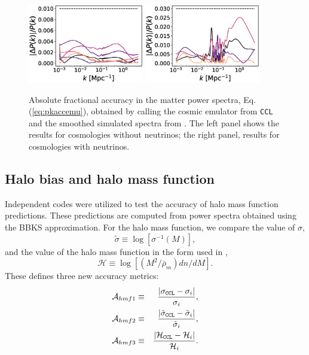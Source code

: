 \documentclass[\docopts]{\docclass}
\newcommand{\ccl}{{\tt CCL}\xspace}
\begin{document}
\begin{figure}
  \centering
  \includegraphics[width=0.45\textwidth]{poweremu.eps}
  \includegraphics[width=0.45\textwidth]{poweremu_nu.eps}
  \caption{Absolute fractional accuracy in the matter power spectra, Eq. (\ref{eq:pkaccemu}), obtained by calling the cosmic emulator from \ccl and the smoothed simulated spectra from \citet{Lawrence17}. The left panel shows the results for cosmologies without neutrinos; the right panel, results for cosmologies with neutrinos.}
  \label{fig:emuacc}
\end{figure}

\subsection{Halo bias and halo mass function}

Independent codes were utilized to test the accuracy of halo mass function predictions. These predictions are computed from power spectra obtained using the BBKS approximation. For the halo mass function, we compare the value of $\sigma$,
\begin{equation}
  \tilde\sigma\equiv\log[\sigma^{-1}(M)],\label{eq:tildesig}
\end{equation}
and the value of the halo mass function in the form used in \cite{Tinker2008},
\begin{equation}
  \mathcal{H}\equiv \log[(M^2/\bar{\rho}_m)dn/dM].
  \label{eq:newhmf}
\end{equation}
These defines three new accuracy metrics:
\begin{eqnarray}
  \mathcal{A}_{hmf1}&\equiv&\frac{|\sigma_{\tt CCL}-\sigma_i|}{\sigma_i},\\
  \mathcal{A}_{hmf2}&\equiv&\frac{|\tilde\sigma_{\tt CCL}-\tilde\sigma_i|}{\tilde\sigma_i},\\
  \mathcal{A}_{hmf3}&\equiv&\frac{|\mathcal{H}_{\tt CCL}-\mathcal{H}_i|}{\mathcal{H}_i}.
\end{eqnarray}
\end{document}
